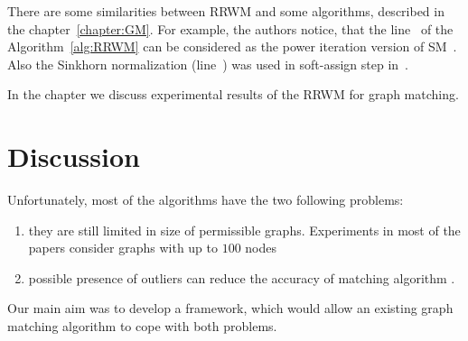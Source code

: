 There are some similarities between RRWM and some algorithms, described in the chapter~\ref{chapter:GM}. For example, the authors notice, that the line~ of the Algorithm~\ref{alg:RRWM} can be considered as the power iteration version of SM~\cite{Leordeanu2005_SM}. Also the Sinkhorn normalization (line~) was used in soft-assign step in~\cite{Rangarajan1996_GAGM}. 

In the chapter  we discuss experimental results of the RRWM for graph matching.

\section{Discussion}

Unfortunately, most of the algorithms have the two following problems:
\begin{enumerate}
\item they are still limited in size of permissible graphs. Experiments in most of the papers consider graphs with up to $100$ nodes \cite{Cho2014_Haystack, Cho2010_RRWM, Cho2012_ProgressiveGM}
\item possible presence of outliers can reduce the accuracy of matching algorithm \cite{Suh_CVPR2015}.
\end{enumerate}  

Our main aim was to develop a framework, which would allow an existing graph matching algorithm to cope with both problems.

